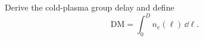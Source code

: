 \TODO\quad Derive the cold-plasma group delay and define
\begin{equation}
\boxed{\mathrm{DM}=\int_0^D n_e(\ell)\,\dd\ell.}
\end{equation}
